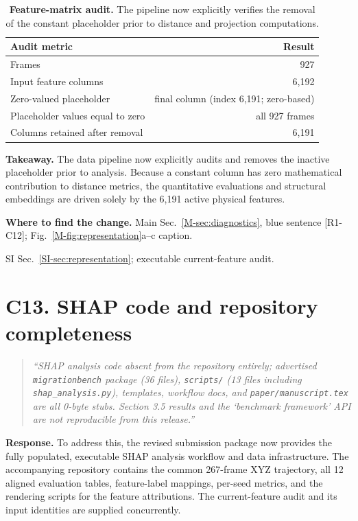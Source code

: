 \documentclass[11pt]{article}
\newcommand{\location}[2]{\par{\small\textbf{Where to find the change.} #1\par #2}\par}
\begin{document}
\begin{table}[!htbp]
\centering\small
\caption{\textbf{Feature-matrix audit.} The pipeline now explicitly verifies the removal of the constant placeholder prior to distance and projection computations.}
\label{tab:resp-c12-feature-audit}
\begin{tabular}{lr}
\toprule
Audit metric & Result \\
\midrule
Frames & 927 \\
Input feature columns & 6,192 \\
Zero-valued placeholder & final column (index 6,191; zero-based) \\
Placeholder values equal to zero & all 927 frames \\
Columns retained after removal & 6,191 \\
\bottomrule
\end{tabular}
\end{table}

\textbf{Takeaway.} The data pipeline now explicitly audits and removes the inactive placeholder prior to analysis. Because a constant column has zero mathematical contribution to distance metrics, the quantitative evaluations and structural embeddings are driven solely by the 6,191 active physical features.
\location{Main Sec.~\ref{M-sec:diagnostics}, blue sentence [R1-C12]; Fig.~\ref{M-fig:representation}a--c caption.}{SI Sec.~\ref{SI-sec:representation}; executable current-feature audit.}
\section*{C13. SHAP code and repository completeness}

\begin{quote}\small \itshape
``SHAP analysis code absent from the repository entirely; advertised \texttt{migrationbench} package (36 files), \texttt{scripts/} (13 files including \texttt{shap\_analysis.py}), templates, workflow docs, and \texttt{paper/manuscript.tex} are all 0-byte stubs. Section 3.5 results and the `benchmark framework' API are not reproducible from this release.''\end{quote}

\textbf{Response.} 
To address this, the revised submission package now provides the fully populated, executable SHAP analysis workflow and data infrastructure. The accompanying repository contains the common 267-frame XYZ trajectory, all 12 aligned evaluation tables, feature-label mappings, per-seed metrics, and the rendering scripts for the feature attributions. The current-feature audit and its input identities are supplied concurrently.
\end{document}
